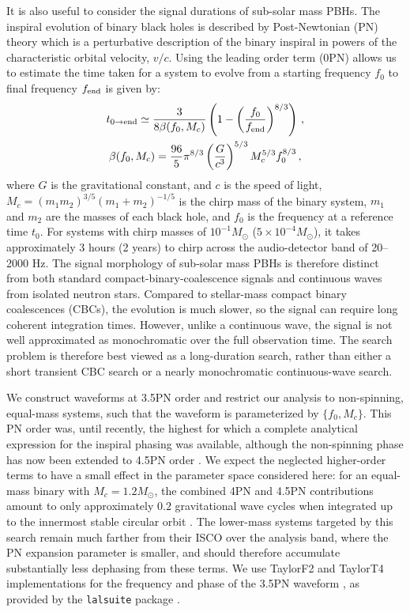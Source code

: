 \documentclass[aps,prd,amsmath,floats,floatfix, twocolumn,
superscriptaddress,nofootinbib,showpacs]{revtex4-2}
\newcommand{\bet}{\ensuremath{\frac{96}{5}\pi^{8/3}\left(\frac{G}{c^3}\right)^{5/3}M^{5/3}_cf^{8/3}_0}}
\begin{document}
It is also useful to consider the signal durations of sub-solar mass PBHs. The inspiral evolution of binary black holes is described by Post-Newtonian (PN) theory which is a perturbative description of the binary inspiral in powers of the characteristic orbital velocity, $v/c$. Using the leading order term (0PN) allows us to estimate the time taken for a system to evolve from a starting frequency $f_0$ to final frequency $f_{\rm end}$ is given by:
\begin{gather}
    t_{\rm 0 \rightarrow end} \simeq \frac{3}{8\beta(f_0, M_c)}\left( 1-\left(\frac{f_0}{f_{\rm end}}\right)^{8/3}\right) \, , \\
    \beta(f_0, M_c) = \bet \, , \label{eq:beta}
\end{gather}
where $G$ is the gravitational constant, and $c$ is the speed of light, $M_c = {(m_1 m_2)^{3/5}}{(m_1 + m_2)^{-1/5}}$ is the chirp mass of the binary system, $m_1$ and $m_2$ are the masses of each black hole, and $f_0$ is the frequency at a reference time $t_0$. 
For systems with chirp masses of $10^{-1}M_\odot$ ($5 \times 10^{-4}M_\odot$), it takes approximately 3 hours (2 years) to chirp across the audio-detector band of 20--2000 Hz. The signal morphology of sub-solar mass PBHs is therefore distinct from both standard compact-binary-coalescence signals and continuous waves from isolated neutron stars. Compared to stellar-mass compact binary coalescences (CBCs), the evolution is much slower, so the signal can require long coherent integration times. However, unlike a continuous wave, the signal is not well approximated as monochromatic over the full observation time. The search problem is therefore best viewed as a long-duration search, rather than either a short transient CBC search or a nearly monochromatic continuous-wave search.

We construct waveforms at 3.5PN order \cite{Blanchet:2001ax, Faye:2012we} and restrict our analysis to non-spinning, equal-mass systems, such that the waveform is parameterized by $\{f_0, M_c\}$. This PN order was, until recently, the highest for which a complete analytical expression for the inspiral phasing was available, although the non-spinning phase has now been extended to 4.5PN order \cite{Blanchet2023_4p5PN}. We expect the neglected higher-order terms to have a small effect in the parameter space considered here: for an equal-mass binary with $M_c=1.2M_\odot$, the combined 4PN and 4.5PN contributions amount to only approximately $0.2$ gravitational wave cycles when integrated up to the innermost stable circular orbit \cite{Blanchet2023_4p5PN}. The lower-mass systems targeted by this search remain much farther from their ISCO over the analysis band, where the PN expansion parameter is smaller, and should therefore accumulate substantially less dephasing from these terms. We use TaylorF2 \cite{Buonanno:2009zt, Pan:2007nw, Boyle:2009dg} and TaylorT4 implementations \cite{Buonanno:2009zt} for the frequency and phase of the 3.5PN waveform \cite{Arun:2004hn}, as provided by the \verb|lalsuite| package \cite{lalsuite, swiglal}.
\end{document}
